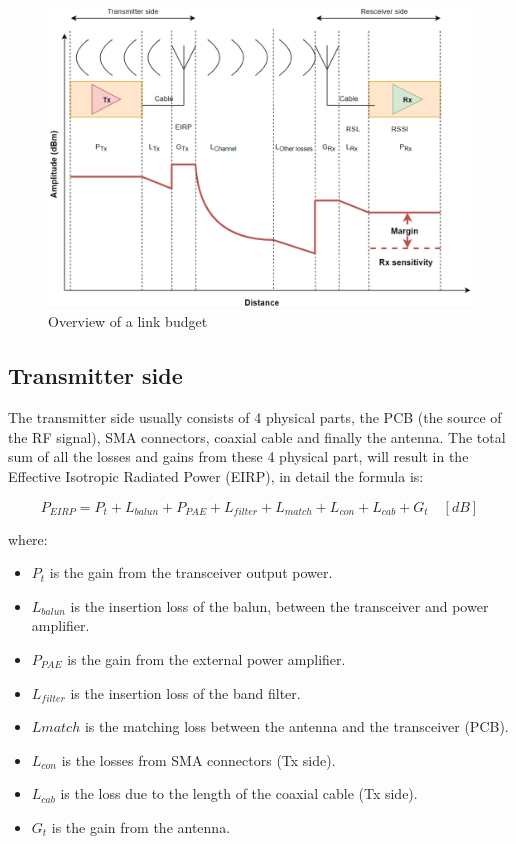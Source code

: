 \begin{figure}[h]
\centering
\hspace*{-2.3cm}
\includegraphics[scale=0.70]{figures/LinkBudgetOverview.PNG}
\caption{Overview of a link budget}
\end{figure}

\subsection{Transmitter side}
The transmitter side usually consists of 4 physical parts, the PCB (the source of the RF signal), SMA connectors, coaxial cable and finally the antenna. The total sum of all the losses and gains from these 4 physical part, will result in the Effective Isotropic Radiated Power (EIRP), in detail the formula is:

\begin{equation}
   P_{EIRP} = P_t+L_{balun}+P_{PAE}+L_{filter}+L_{match}+L_{con}+L_{cab}+G_{t} \quad [dB]
\end{equation}

where:

\begin{itemize}
    \item $P_t$ is the gain from the transceiver output power.
    \item $L_{balun}$ is the insertion loss of the balun, between the transceiver and power amplifier.
    \item $P_{PAE}$ is the gain from the external power amplifier.
    \item $L_{filter}$ is the insertion loss of the band filter.
    \item $L{match}$ is the matching loss between the antenna and the transceiver (PCB).
    \item $L_{con}$ is the losses from SMA connectors (Tx side).
    \item $L_{cab}$ is the loss due to the length of the coaxial cable (Tx side).
    \item $G_{t}$ is the gain from the antenna.
\end{itemize}

